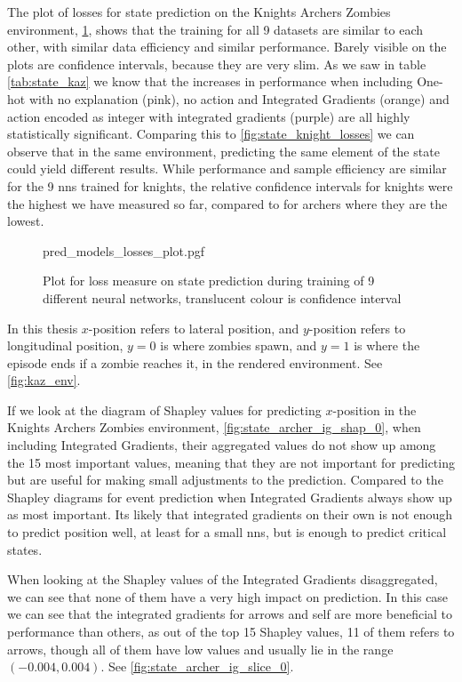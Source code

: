 \documentclass[UKenglish]{uiomasterthesis}
\begin{document}
The plot of losses for state prediction on the Knights Archers Zombies environment, \cref{fig:state_archer_losses}, shows that the training for all 9 datasets are similar to each other, with similar data efficiency and similar performance. Barely visible on the plots are confidence intervals, because they are very slim. As we saw in table \cref{tab:state_kaz} we know that the increases in performance when including One-hot with no explanation (pink), no action and Integrated Gradients (orange) and action encoded as integer with integrated gradients (purple) are all highly statistically significant. Comparing this to \cref{fig:state_knight_losses} we can observe that in the same environment, predicting the same element of the state could yield different results. While performance and sample efficiency are similar for the 9 \acp{nn} trained for knights, the relative confidence intervals for knights were the highest we have measured so far, compared to for archers where they are the lowest.

\begin{figure}[hbtp]
\centering
{pred_models_losses_plot.pgf}
\caption{Plot for loss measure on state prediction during training of 9 different neural networks, translucent colour is confidence interval}
\label{fig:state_archer_losses}
\end{figure}

In this thesis $x$-position refers to lateral position, and $y$-position refers to longitudinal position, $y=0$ is where zombies spawn, and $y=1$ is where the episode ends if a zombie reaches it, in the rendered environment. See \cref{fig:kaz_env}.

If we look at the diagram of Shapley values for predicting $x$-position in the Knights Archers Zombies environment, \cref{fig:state_archer_ig_shap_0}, when including Integrated Gradients, their aggregated values do not show up among the 15 most important values, meaning that they are not important for predicting but are useful for making small adjustments to the prediction. Compared to the Shapley diagrams for event prediction when Integrated Gradients always show up as most important. Its likely that integrated gradients on their own is not enough to predict position well, at least for a small \acp{nn}, but is enough to predict critical states.

When looking at the Shapley values of the Integrated Gradients disaggregated, we can see that none of them have a very high impact on prediction. In this case we can see that the integrated gradients for arrows and self are more beneficial to performance than others, as out of the top 15 Shapley values, 11 of them refers to arrows, though all of them have low values and usually lie in the range $(-0.004, 0.004)$. See \cref{fig:state_archer_ig_slice_0}. 
\end{document}
